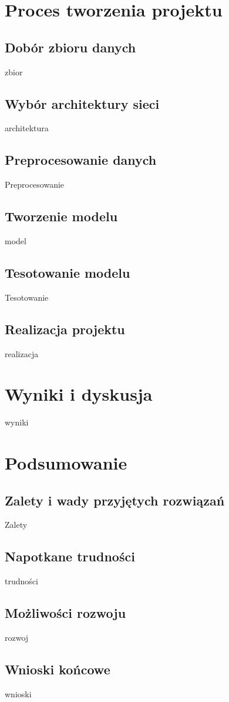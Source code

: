 \documentclass[12pt]{article}
\begin{document}
\begin{sloppypar}
\section{Proces tworzenia projektu}
{
  \subsection{Dobór zbioru danych}
  {
    zbior
  }
  \subsection{Wybór architektury sieci}
  {
    architektura
  }
  \subsection{Preprocesowanie danych}
  {
    Preprocesowanie
  }
  \subsection{Tworzenie modelu}
  {
    model
  }
  \subsection{Tesotowanie modelu}
  {
    Tesotowanie
  }
  \subsection{Realizacja projektu}
  {
    realizacja
  }
}

\section{Wyniki i dyskusja}
{
  wyniki
}

\section{Podsumowanie}
{
  \subsection{Zalety i wady przyjętych rozwiązań}
  {
    Zalety
  }
  \subsection{Napotkane trudności}
  {
    trudności
  }
  \subsection{Możliwości rozwoju}
  {
    rozwoj
  }
  \subsection{Wnioski końcowe}
  {
    wnioski
  }
}

\clearpage
\printbibliography[
  heading=bibintoc,
  title={Bibliografia}
]

\clearpage
\listoffigures

\clearpage
\listoftables

\clearpage
{}
\lstlistoflistings

\end{sloppypar}
\end{document}
